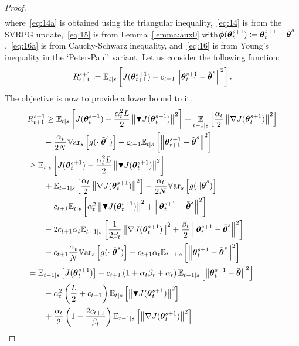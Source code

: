 \begin{proof}
\begin{align}
	\end{align}
	\endgroup
	where~\eqref{eq:14a} is obtained using the triangular inequality,~\eqref{eq:14} is from the \acs{SVRPG} update,~\eqref{eq:15} is from Lemma~\ref{lemma:aux0} with\newline $\vphi(\vtheta_t^{s+1})\coloneqq\vtheta_t^{s+1}-\tilde{\vtheta}^s$,~\eqref{eq:16a} is from Cauchy-Schwarz inequality, and~\eqref{eq:16} is from Young's inequality in the `Peter-Paul' variant.
	Let us consider the following function:
	\begin{equation}\label{E:lyapunov.function}
	R_{t+1}^{s+1} \coloneqq \Ets{J(\vtheta_{t+1}^{s+1}) - c_{t+1}\norm[]{\vtheta_{t+1}^{s+1}-\tilde{\vtheta}^s}^2}. 
	\end{equation}
	The objective is now to provide a lower bound to it.
	\begingroup
	\allowdisplaybreaks
	\begin{align}
	&R_{t+1}^{s+1} 
	\geq	\Ets{J(\vtheta_t^{s+1}) - \frac{\alpha_t^2L}{2}\norm[]{\gradBlack{\vtheta_t^{s+1}}}^2}
	+ \EVV[t-1|s]{\frac{\alpha_t}{2}\norm[]{\gradJ{\vtheta_t^{s+1}}}^2}
	\nonumber\\
	&\qquad-
	\frac{\alpha_t}{2N}\Vars{g(\cdot\vert\tilde{\vtheta}^s)}
	-c_{t+1}\Ets{\norm[]{\vtheta_{t+1}^{s+1}-\tilde{\vtheta}^s}^2} \label{eq:17}\\
	&\geq \Ets{J(\vtheta_t^{s+1}) - \frac{\alpha_t^2L}{2}\norm[]{\gradBlack{\vtheta_t^{s+1}}}^2}\\
	&\qquad+ \Ets[t-1]{\frac{\alpha_t}{2}\norm[]{\gradJ{\vtheta_t^{s+1}}}^2 }
	-\frac{\alpha_t}{2N}\Vars{g(\cdot\vert\tilde{\vtheta}^s)} \nonumber\\
	&\qquad -c_{t+1}\Ets{\alpha_t^2\norm[]{\gradBlack{\vtheta_t^{s+1}}}^2+\norm[]{\vtheta_t^{s+1}-\tilde{\vtheta}^s}^2}
	\nonumber\\
	&\qquad-2c_{t+1}\alpha_t\Ets[t-1]{\frac{1}{2\beta_t}\norm[]{\gradJ{\vtheta_t^{s+1}}}^2+\frac{\beta_t}{2}\norm[]{\vtheta_t^{s+1}-\tilde{\vtheta}^s}^2} \nonumber\\ 
	&\qquad
	-c_{t+1}\frac{\alpha_t}{N}\Vars{g(\cdot\vert\tilde{\vtheta}^s)} -c_{t+1}\alpha_t\Ets[t-1]{\norm[]{\vtheta_t^{s+1}-\tilde{\vtheta}^s}^2} \label{eq:18}\\
	&= \Ets[t-1]{J(\vtheta_t^{s+1})} - c_{t+1}\left(1+\alpha_t\beta_t+\alpha_t\right)\Ets[t-1]{\norm[]{\vtheta_{t}^{s+1}-\tilde{\vtheta}}^2} \nonumber\\
	&\qquad-\alpha_t^2\left(\frac{L}{2}+c_{t+1}\right)\Ets{\norm[]{\gradBlack{\vtheta_t^{s+1}}}^2}\nonumber\\ &\qquad+\frac{\alpha_t}{2}\left(1-\frac{2c_{t+1}}{\beta_t}\right)\Ets[t-1]{\norm[]{\gradJ{\vtheta_t^{s+1}}}^2} \nonumber\\

\end{align}
\end{proof}
